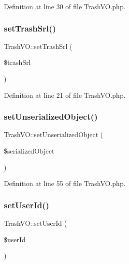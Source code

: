 Definition at line 30 of file Trash\+V\+O.\+php.

\hypertarget{classTrashVO_a2f8108d81c6db69b8c954b028bcef8dc}{}\label{classTrashVO_a2f8108d81c6db69b8c954b028bcef8dc} 
\subsubsection{\texorpdfstring{set\+Trash\+Srl()}{setTrashSrl()}}
{\footnotesize\ttfamily Trash\+V\+O\+::set\+Trash\+Srl (\begin{DoxyParamCaption}\item[{}]{\$trash\+Srl }\end{DoxyParamCaption})}



Definition at line 21 of file Trash\+V\+O.\+php.

\hypertarget{classTrashVO_affa3c85e2c01ad0e687afd9cdae171c0}{}\label{classTrashVO_affa3c85e2c01ad0e687afd9cdae171c0} 
\subsubsection{\texorpdfstring{set\+Unserialized\+Object()}{setUnserializedObject()}}
{\footnotesize\ttfamily Trash\+V\+O\+::set\+Unserialized\+Object (\begin{DoxyParamCaption}\item[{}]{\$serialized\+Object }\end{DoxyParamCaption})}



Definition at line 55 of file Trash\+V\+O.\+php.

\hypertarget{classTrashVO_a170dc90ea1fec615ccc7aef649f89390}{}\label{classTrashVO_a170dc90ea1fec615ccc7aef649f89390} 
\subsubsection{\texorpdfstring{set\+User\+Id()}{setUserId()}}
{\footnotesize\ttfamily Trash\+V\+O\+::set\+User\+Id (\begin{DoxyParamCaption}\item[{}]{\$user\+Id }\end{DoxyParamCaption})}



